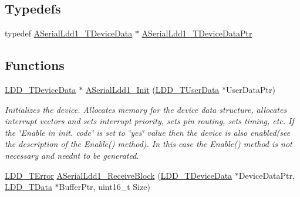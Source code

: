 \subsection*{Typedefs}
\begin{DoxyCompactItemize}
\item 
typedef \hyperlink{struct_a_serial_ldd1___t_device_data}{A\+Serial\+Ldd1\+\_\+\+T\+Device\+Data} $\ast$ \hyperlink{group___a_serial_ldd1__module_ga3d5a6f8c983c88c4447d8c30465a7d12}{A\+Serial\+Ldd1\+\_\+\+T\+Device\+Data\+Ptr}
\end{DoxyCompactItemize}
\subsection*{Functions}
\begin{DoxyCompactItemize}
\item 
\hyperlink{group___p_e___types__module_gac5cf1362f1f0e3a2ce71b1bf2276d091}{L\+D\+D\+\_\+\+T\+Device\+Data} $\ast$ \hyperlink{group___a_serial_ldd1__module_ga72a2988ac3b4e592eb9dd9c9cf0db38f}{A\+Serial\+Ldd1\+\_\+\+Init} (\hyperlink{group___p_e___types__module_ga0b66a73f87238a782318aa0be7578e35}{L\+D\+D\+\_\+\+T\+User\+Data} $\ast$User\+Data\+Ptr)
\begin{DoxyCompactList}\small\item\em Initializes the device. Allocates memory for the device data structure, allocates interrupt vectors and sets interrupt priority, sets pin routing, sets timing, etc. If the \char`\"{}\+Enable
    in init. code\char`\"{} is set to \char`\"{}yes\char`\"{} value then the device is also enabled(see the description of the Enable() method). In this case the Enable() method is not necessary and needn\textquotesingle{}t to be generated. \end{DoxyCompactList}\item 
\hyperlink{group___p_e___types__module_ga24c2b045fd04e79e85f261ce4df35588}{L\+D\+D\+\_\+\+T\+Error} \hyperlink{group___a_serial_ldd1__module_gad445e8cc518c6e88fc212bd6d4e06490}{A\+Serial\+Ldd1\+\_\+\+Receive\+Block} (\hyperlink{group___p_e___types__module_gac5cf1362f1f0e3a2ce71b1bf2276d091}{L\+D\+D\+\_\+\+T\+Device\+Data} $\ast$Device\+Data\+Ptr, \hyperlink{group___p_e___types__module_gade8ef9401405bd941b6da738b807f980}{L\+D\+D\+\_\+\+T\+Data} $\ast$Buffer\+Ptr, uint16\+\_\+t Size)

\end{DoxyCompactItemize}
